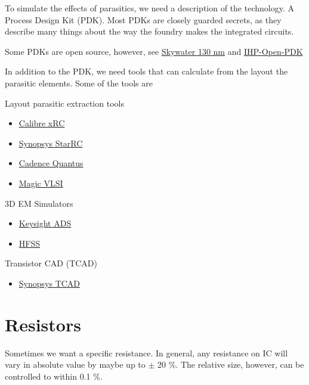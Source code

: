 To simulate the effects of parasitics, we need a description of the
technology. A Process Design Kit (PDK). Most PDKs are closely guarded
secrets, as they describe many things about the way the foundry makes
the integrated circuits.

Some PDKs are open source, however, see
\href{https://skywater-pdk.readthedocs.io}{Skywater 130 nm} and
\href{https://github.com/IHP-GmbH/IHP-Open-PDK}{IHP-Open-PDK}

In addition to the PDK, we need tools that can calculate from the layout
the parasitic elements. Some of the tools are

Layout parasitic extraction tools

\begin{itemize}
\tightlist
\item
  \href{https://eda.sw.siemens.com/en-US/ic/calibre-design/circuit-verification/xrc/}{Calibre
  xRC}
\item
  \href{https://www.synopsys.com/implementation-and-signoff/signoff/starrc.html}{Synopsys
  StarRC}
\item
  \href{https://www.cadence.com/en_US/home/tools/digital-design-and-signoff/silicon-signoff/quantus-extraction-solution.html}{Cadence
  Quantus}
\item
  \href{http://opencircuitdesign.com/magic/}{Magic VLSI}
\end{itemize}

3D EM Simulators

\begin{itemize}
\tightlist
\item
  \href{https://www.keysight.com/zz/en/products/software/pathwave-design-software/pathwave-advanced-design-system.html}{Keysight
  ADS}
\item
  \href{https://www.ansys.com/products/electronics/ansys-hfss}{HFSS}
\end{itemize}

Transistor CAD (TCAD)

\begin{itemize}
\tightlist
\item
  \href{https://www.synopsys.com/silicon/tcad.html}{Synopsys TCAD}
\end{itemize}

\section{Resistors}\label{resistors}

Sometimes we want a specific resistance. In general, any resistance on
IC will vary in absolute value by maybe up to \(\pm\) 20 \%. The
relative size, however, can be controlled to within 0.1 \%.

